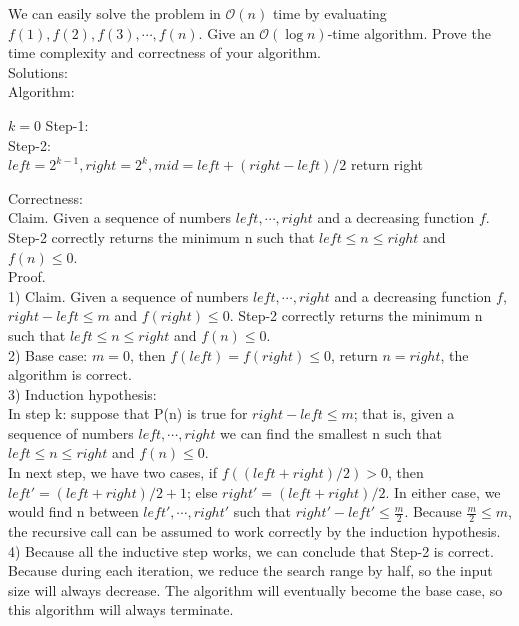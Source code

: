 \documentclass[12pt,letterpaper]{article}
\begin{document}
\begin{enumerate}
We can easily solve the problem in $\mathcal{O}(n)$ time by evaluating $f(1),f(2),f(3),\cdots,f(n)$. Give an $\mathcal{O}(\log n)$-time algorithm. Prove the time complexity and correctness of your algorithm. \\
Solutions: \\
Algorithm: \\
\begin{algorithm}[H]
 $ k = 0$ \;
 Step-1: \\
  Step-2: \\
 $ left = 2 ^ {k-1}, right = 2^{k}, mid = left + (right - left)/2 $ \;
 return right\;
\end{algorithm}
Correctness: \\
Claim. Given a sequence of numbers $ left, \cdots, right $ and a decreasing function $f$. Step-2 correctly returns the minimum n such that $ left \le n \le right $ and $f(n) \le 0$. \\
Proof. \\
1) Claim. Given a sequence of numbers $ left, \cdots, right $ and a decreasing function $f$, $right - left \le m$ and $f(right) \le 0$. Step-2 correctly returns the minimum n such that $ left \le n \le right $ and $f(n) \le 0$. \\
2) Base case: $ m = 0$, then $f(left) = f(right) \le 0$, return $ n = right $, the algorithm is correct. \\
3) Induction hypothesis: \\
In step k: suppose that P(n) is true for $right - left \le m$; that is, given a sequence of numbers $left, \cdots, right$ we can find the smallest n such that $left \le n \le right$ and $f(n) \le 0$. \\
In next step, we have two cases, if $ f((left + right)/2) > 0 $, then $ left' = (left+right)/2 + 1$; else $right' = (left+right)/2$. In either case, we would find n between $left', \cdots, right'$ such that $right' - left' \le \frac{m}{2}$. Because $\frac{m}{2} \le m$, the recursive call can be assumed to work correctly by the induction hypothesis. \\
4) Because all the inductive step works, we can conclude that Step-2 is correct. \\
Because during each iteration, we reduce the search range by half, so the input size will always decrease. The algorithm will eventually become the base case, so this algorithm will always terminate. \\

\end{enumerate}
\end{document}
